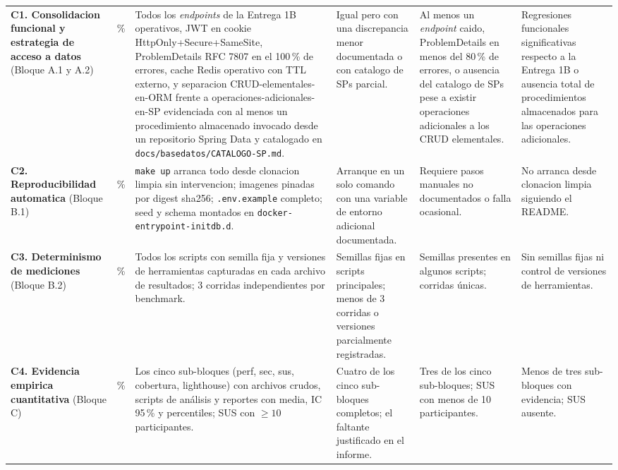 \documentclass[11pt,a4paper]{article}
\begin{document}
{\begin{longtable}{|L{3.0cm}|C{0.9cm}|L{2.5cm}|L{2.5cm}|L{2.5cm}|L{2.3cm}|}
\textbf{C1. Consolidacion funcional y estrategia de acceso a datos} (Bloque A.1 y A.2) &
\,\% &
Todos los \emph{endpoints} de la Entrega 1B operativos, JWT en cookie HttpOnly+Secure+SameSite, ProblemDetails RFC 7807 en el 100\,\% de errores, cache Redis operativo con TTL externo, y separacion CRUD-elementales-en-ORM frente a operaciones-adicionales-en-SP evidenciada con al menos un procedimiento almacenado invocado desde un repositorio Spring Data y catalogado en \texttt{docs/basedatos/CATALOGO-SP.md}. &
Igual pero con una discrepancia menor documentada o con catalogo de SPs parcial. &
Al menos un \emph{endpoint} caido, ProblemDetails en menos del 80\,\% de errores, o ausencia del catalogo de SPs pese a existir operaciones adicionales a los CRUD elementales. &
Regresiones funcionales significativas respecto a la Entrega 1B o ausencia total de procedimientos almacenados para las operaciones adicionales. \\

\textbf{C2. Reproducibilidad automatica} (Bloque B.1) &
\,\% &
\texttt{make up} arranca todo desde clonacion limpia sin intervencion; imagenes pinadas por digest sha256; \texttt{.env.example} completo; seed y schema montados en \texttt{docker-entrypoint-initdb.d}. &
Arranque en un solo comando con una variable de entorno adicional documentada. &
Requiere pasos manuales no documentados o falla ocasional. &
No arranca desde clonacion limpia siguiendo el README. \\

\textbf{C3. Determinismo de mediciones} (Bloque B.2) &
\,\% &
Todos los scripts con semilla fija y versiones de herramientas capturadas en cada archivo de resultados; 3 corridas independientes por benchmark. &
Semillas fijas en scripts principales; menos de 3 corridas o versiones parcialmente registradas. &
Semillas presentes en algunos scripts; corridas \'{u}nicas. &
Sin semillas fijas ni control de versiones de herramientas. \\

\textbf{C4. Evidencia empirica cuantitativa} (Bloque C) &
\,\% &
Los cinco sub-bloques (perf, sec, sus, cobertura, lighthouse) con archivos crudos, scripts de an\'{a}lisis y reportes con media, IC 95\,\% y percentiles; SUS con $\geq 10$ participantes. &
Cuatro de los cinco sub-bloques completos; el faltante justificado en el informe. &
Tres de los cinco sub-bloques; SUS con menos de 10 participantes. &
Menos de tres sub-bloques con evidencia; SUS ausente. \\


\end{longtable}}
\end{document}
